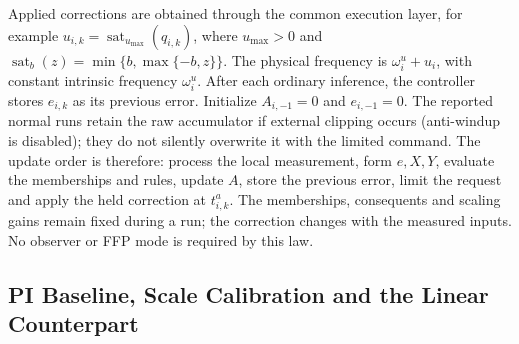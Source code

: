 Applied corrections are obtained through the common execution layer, for
example $u_{i,k}=\operatorname{sat}_{u_{\max}}(q_{i,k})$, where $u_{\max}>0$ and $\operatorname{sat}_{b}(z)=\min\{b,\max\{-b,z\}\}$. The physical frequency is $\omega_i^u+u_i$, with constant intrinsic frequency $\omega_i^u$.
After each ordinary inference, the controller stores $e_{i,k}$ as its
previous error. Initialize $A_{i,-1}=0$ and $e_{i,-1}=0$. The reported
normal runs retain the raw accumulator if external clipping occurs
(anti-windup is disabled); they do not silently overwrite it with the
limited command. The update order is therefore: process the local
measurement, form $e,X,Y$, evaluate the memberships and rules, update
$A$, store the previous error, limit the request and apply the held
correction at $t^a_{i,k}$. The memberships, consequents and scaling gains
remain fixed during a run; the correction changes with the measured
inputs. No observer or FFP mode is required by this law.

\subsection{PI Baseline, Scale Calibration and the Linear Counterpart}
\label{subsec:fpi_calibration}

